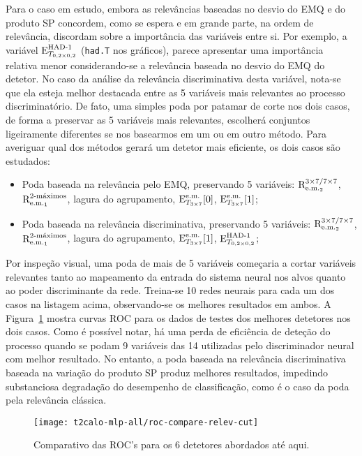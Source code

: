 Para o caso em estudo, embora as relevâncias baseadas no desvio do EMQ e do
produto SP concordem, como se espera e em grande parte, na ordem de
relevância, discordam sobre a importância das variáveis entre si. Por exemplo,
a variável $\ethad$ (\texttt{had.T} nos gráficos), parece apresentar uma
importância relativa menor considerando-se a relevância baseada no desvio do
EMQ do detetor. No caso da análise da relevância discriminativa desta
variável, nota-se que ela esteja melhor destacada entre as 5 variáveis mais
relevantes ao processo discriminatório. De fato, uma simples poda por patamar
de corte nos dois casos, de forma a preservar as 5 variáveis mais relevantes,
escolherá conjuntos ligeiramente diferentes se nos basearmos em um ou em outro
método. Para averiguar qual dos métodos gerará um detetor mais eficiente, os
dois casos são estudados:

\begin{itemize}
\item Poda baseada na relevância pelo EMQ, preservando 5 variáveis: $\rcore$,
$\eratio$, lagura do agrupamento, $\etem[0]$, $\etem[1]$;
\item Poda baseada na relevância discriminativa, preservando 5 variáveis:
$\rcore$, $\eratio$, lagura do agrupamento, $\etem[1]$, $\ethad$;
\end{itemize}

Por inspeção visual, uma poda de mais de 5 variáveis começaria a cortar
variáveis relevantes tanto ao mapeamento da entrada do sistema neural nos
alvos quanto ao poder discriminante da rede. Treina-se 10 redes neurais para
cada um dos casos na listagem acima, observando-se os melhores resultados em
ambos. A Figura~\ref{fig:t2calo-all-relev-cut-compare} mostra curvas ROC para
os dados de testes dos melhores detetores nos dois casos. Como é possível
notar, há uma perda de eficiência de deteção do processo quando se podam 9
variáveis das 14 utilizadas pelo discriminador neural com melhor resultado. No
entanto, a poda baseada na relevância discriminativa baseada na variação do
produto SP produz melhores resultados, impedindo substanciosa degradação do
desempenho de classificação, como é o caso da poda pela relevância clássica.

\begin{figure}
\begin{center}
\texttt{[image: t2calo-mlp-all/roc-compare-relev-cut]}
\end{center}
\caption{Comparativo das ROC's para os 6 detetores abordados até aqui.}
\label{fig:t2calo-all-relev-cut-compare}
\end{figure}

